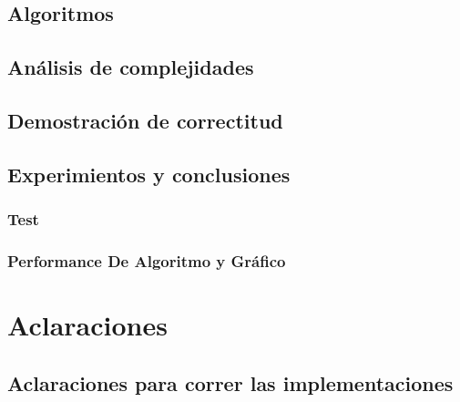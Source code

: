 \documentclass[12pt, a4paper]{article}
\begin{document}
\subsection{Algoritmos}

\subsection{An\'alisis de complejidades}

\subsection{Demostraci\'on de correctitud}
%

\subsection{Experimientos y conclusiones}
\subsubsection[2.5]{Test}

\subsubsection[2.5]{Performance De Algoritmo y Gr\'afico}


\newpage
\section{Aclaraciones} 
\subsection{Aclaraciones para correr las implementaciones}

\end{document}

